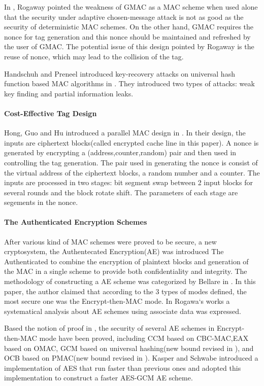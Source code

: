 \documentclass{article}
\begin{document}
In \cite{Rogaway2011}, Rogaway pointed the weakness of GMAC as a MAC scheme when used alone that the security under adaptive chosen-message attack is not as good as the security of deterministic MAC schemes. On the other hand, GMAC requires the nonce for tag generation and this nonce should be maintained and refreshed by the user of GMAC. The potential issue of this design pointed by Rogaway is the reuse of nonce, which may lead to the collision of the tag. 

Handschuh and Preneel introduced key-recovery attacks on universal hash function based MAC algorithms in \cite{key_recover}. They introduced two types of attacks: weak key finding and partial information leaks.

\paragraph{Cost-Effective Tag Design}
Hong, Guo and Hu introduced a parallel MAC design in \cite{cetd}.
In their design, the inputs are ciphertext blocks(called encrypted cache line in this paper). A nonce is generated by encrypting a (address,counter,random) pair and then used in controlling the tag generation. The pair used in generating the nonce is consist of the virtual address of the ciphertext blocks, a random number and a counter. The inputs are processed in two stages: bit segment swap between 2 input blocks for several rounds and the block rotate shift. The parameters of each stage are segements in the nonce.

\paragraph{The Authenticated Encryption Schemes}
After various kind of MAC schemes were proved to be secure, a new cryptosystem,
	  the Authentecated Encryption(AE) was introduced The Authenticated to combine the encryption of
plaintext blocks and generation of the MAC in a single scheme to provide both
confidentiality and integrity. The methodology of constructing a AE scheme was categorized by
Bellare in \cite{AE_mode}. In this paper, the author claimed that according to
the 3 types of modes defined, the most secure one was the Encrypt-then-MAC mode.
In Rogawa`s works \cite{aead} a systematical analysis about AE
schemes using associate data was expressed.  

Based the notion of proof in \cite{aead}, the security of several AE schemes in
Encrypt-then-MAC mode have been proved, including CCM \cite{ccm}based on
CBC-MAC,EAX\cite{eax} based on OMAC, GCM
\cite{gcm} based on universal hashing(new bound revised in \cite{breaking}), and
OCB\cite{ocb} based on PMAC(new bound revised in \cite{tweak,iPMAC}). Kasper and
Schwabe introduced a implementation of AES that run faster than previous ones
and adopted this implementation to construct a faster AES-GCM AE
scheme\cite{fast}.
\end{document}
